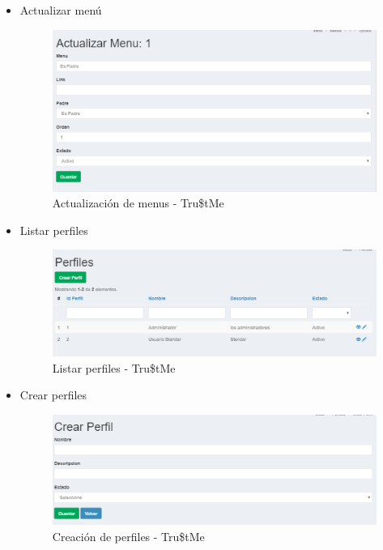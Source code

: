 {{\begin{itemize}
		\item Actualizar menú
		\begin{figure}[H]
			\centering
			\includegraphics[width=1\linewidth]{development/actualizarmenu.png}
			\caption{Actualización de menus - Tru\$tMe}
		\end{figure}
		
		\item Listar perfiles
		\begin{figure}[H]
			\centering
			\includegraphics[width=1\linewidth]{development/listarperfiles.png}
			\caption{Listar perfiles - Tru\$tMe}
		\end{figure}
		
		\item Crear perfiles
		\begin{figure}[H]
			\centering
			\includegraphics[width=1\linewidth]{development/crearperfiles.png}
			\caption{Creación de perfiles - Tru\$tMe}
		\end{figure}
		

\end{itemize}}}
